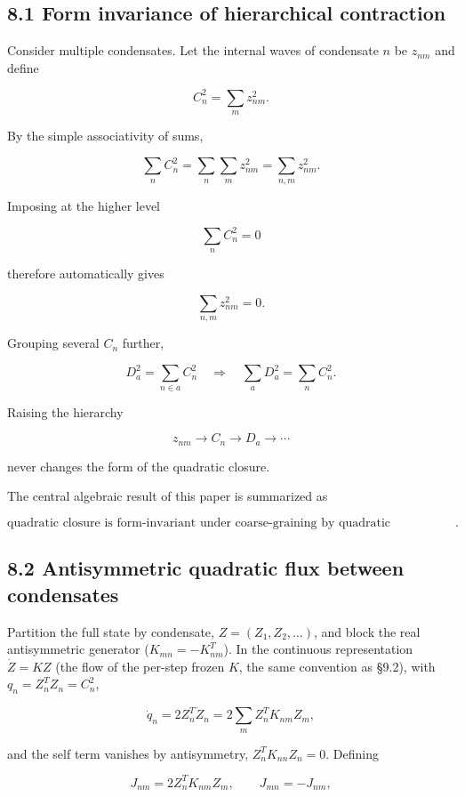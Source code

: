 \documentclass[
  a4paper,
]{article}
\begin{document}
\subsection{8.1 Form invariance of hierarchical
contraction}\label{form-invariance-of-hierarchical-contraction}

Consider multiple condensates. Let the internal waves of condensate
\(n\) be \(z_{nm}\) and define

\[
\boxed{
C_n^2=\sum_m z_{nm}^2
}.
\]

By the simple associativity of sums,

\[
\sum_n C_n^2
=
\sum_n\sum_m z_{nm}^2
=
\sum_{n,m}z_{nm}^2.
\]

Imposing at the higher level

\[
\boxed{
\sum_n C_n^2=0
}
\]

therefore automatically gives

\[
\boxed{
\sum_{n,m}z_{nm}^2=0
}.
\]

Grouping several \(C_n\) further,

\[
D_a^2=\sum_{n\in a}C_n^2
\quad\Longrightarrow\quad
\sum_aD_a^2=\sum_nC_n^2.
\]

Raising the hierarchy

\[
z_{nm}\rightarrow C_n\rightarrow D_a\rightarrow\cdots
\]

never changes the form of the quadratic closure.

The central algebraic result of this paper is summarized as

\[
\boxed{
\text{quadratic closure is form-invariant under coarse-graining by quadratic condensation}
}.
\]

\subsection{8.2 Antisymmetric quadratic flux between
condensates}\label{antisymmetric-quadratic-flux-between-condensates}

Partition the full state by condensate, \(Z=(Z_1,Z_2,\ldots)\), and
block the real antisymmetric generator (\(K_{mn}=-K_{nm}^T\)). In the
continuous representation \(\dot Z=KZ\) (the flow of the per-step frozen
\(K\), the same convention as §9.2), with \(q_n=Z_n^TZ_n=C_n^2\),

\[
\dot q_n
=
2Z_n^T\dot Z_n
=
2\sum_m Z_n^TK_{nm}Z_m,
\]

and the self term vanishes by antisymmetry, \(Z_n^TK_{nn}Z_n=0\).
Defining

\[
\boxed{J_{nm}=2Z_n^TK_{nm}Z_m},
\qquad
\boxed{J_{mn}=-J_{nm}},
\]
\end{document}

